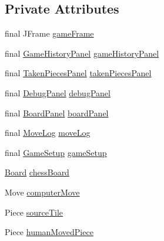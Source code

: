\subsection*{Private Attributes}
\begin{DoxyCompactItemize}
\item 
final J\+Frame \mbox{\hyperlink{classcom_1_1chess_1_1gui_1_1_table_a57dd7d8867061c446aeff9ebfe2d35e9}{game\+Frame}}
\item 
final \mbox{\hyperlink{classcom_1_1chess_1_1gui_1_1_game_history_panel}{Game\+History\+Panel}} \mbox{\hyperlink{classcom_1_1chess_1_1gui_1_1_table_a543d3867c931dbb91977b311e2bf37e5}{game\+History\+Panel}}
\item 
final \mbox{\hyperlink{classcom_1_1chess_1_1gui_1_1_taken_pieces_panel}{Taken\+Pieces\+Panel}} \mbox{\hyperlink{classcom_1_1chess_1_1gui_1_1_table_ac620beb86d33a51f4d425ab031cfb20f}{taken\+Pieces\+Panel}}
\item 
final \mbox{\hyperlink{classcom_1_1chess_1_1gui_1_1_debug_panel}{Debug\+Panel}} \mbox{\hyperlink{classcom_1_1chess_1_1gui_1_1_table_a6cc65fa2851bbfa1a4d5ab45aa672d0f}{debug\+Panel}}
\item 
final \mbox{\hyperlink{classcom_1_1chess_1_1gui_1_1_table_1_1_board_panel}{Board\+Panel}} \mbox{\hyperlink{classcom_1_1chess_1_1gui_1_1_table_a141a17d073e1c874f7ac773a6a59fbd3}{board\+Panel}}
\item 
final \mbox{\hyperlink{classcom_1_1chess_1_1gui_1_1_table_1_1_move_log}{Move\+Log}} \mbox{\hyperlink{classcom_1_1chess_1_1gui_1_1_table_a021c306ce0ce8f3641a1c46892048d1e}{move\+Log}}
\item 
final \mbox{\hyperlink{classcom_1_1chess_1_1gui_1_1_game_setup}{Game\+Setup}} \mbox{\hyperlink{classcom_1_1chess_1_1gui_1_1_table_adf23b1adc59603aad748c026ccbc23e3}{game\+Setup}}
\item 
\mbox{\hyperlink{classcom_1_1chess_1_1engine_1_1classic_1_1board_1_1_board}{Board}} \mbox{\hyperlink{classcom_1_1chess_1_1gui_1_1_table_a8cdb1075805aa4160384f67d2e0578fc}{chess\+Board}}
\item 
Move \mbox{\hyperlink{classcom_1_1chess_1_1gui_1_1_table_addb8c0d825c56b439939e6b065a3b22a}{computer\+Move}}
\item 
Piece \mbox{\hyperlink{classcom_1_1chess_1_1gui_1_1_table_a287446750f688180baaf1e3a38fce04e}{source\+Tile}}
\item 
Piece \mbox{\hyperlink{classcom_1_1chess_1_1gui_1_1_table_ad8bca7099ba8de40430daecde7b9c006}{human\+Moved\+Piece}}
\item 

\end{DoxyCompactItemize}
